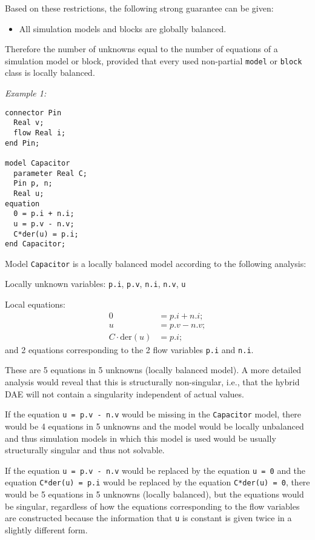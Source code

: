 Based on these restrictions, the following strong guarantee can be given:
\begin{itemize}
\item All simulation models and blocks are globally balanced.
\end{itemize}

\begin{nonnormative}
Therefore the number of unknowns equal to the number of equations of a simulation model or block, provided that every used non-partial \lstinline!model! or \lstinline!block! class is locally balanced.
\end{nonnormative}

\begin{example}
\emph{Example 1:}
\begin{lstlisting}[language=modelica]
connector Pin
  Real v;
  flow Real i;
end Pin;

model Capacitor
  parameter Real C;
  Pin p, n;
  Real u;
equation
  0 = p.i + n.i;
  u = p.v - n.v;
  C*der(u) = p.i;
end Capacitor;
\end{lstlisting}

Model \lstinline!Capacitor! is a locally balanced model according to the following analysis:

Locally unknown variables: \lstinline!p.i!, \lstinline!p.v!, \lstinline!n.i!, \lstinline!n.v!, \lstinline!u!

Local equations:
\begin{align*}
0 &= p.i + n.i;\\
u &= p.v - n.v;\\
C \cdot \text{der}(u) &= p.i;
\end{align*}
and 2 equations corresponding to the 2 flow variables \lstinline!p.i! and \lstinline!n.i!.

These are 5 equations in 5 unknowns (locally balanced model).  A more detailed analysis would reveal that this is structurally non-singular, i.e., that
the hybrid DAE will not contain a singularity independent of actual values.

If the equation \lstinline!u = p.v - n.v! would be missing in the \lstinline!Capacitor! model, there would be 4 equations in 5 unknowns and the model
would be locally unbalanced and thus simulation models in which this model is used would be usually structurally singular and thus not solvable.

If the equation \lstinline!u = p.v - n.v! would be replaced by the equation \lstinline!u = 0! and the equation \lstinline!C*der(u) = p.i! would be
replaced by the equation \lstinline!C*der(u) = 0!, there would be 5 equations in 5 unknowns (locally balanced), but the equations would be singular,
regardless of how the equations corresponding to the flow variables are constructed because the information that \lstinline!u! is constant is given twice
in a slightly different form.
\end{example}


